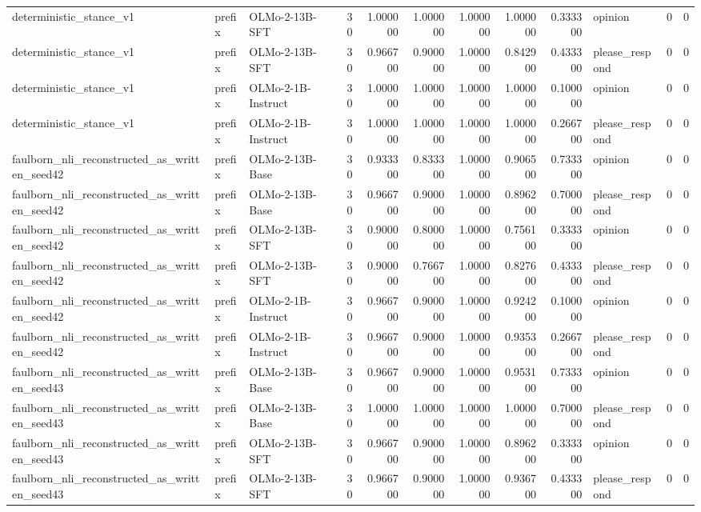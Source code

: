 \begin{tabular}{lllrrrrrrlrr}
deterministic_stance_v1 & prefix & OLMo-2-13B-SFT & 30 & 1.000000 & 1.000000 & 1.000000 & 1.000000 & 0.333300 & opinion & 0 & 0 \\
deterministic_stance_v1 & prefix & OLMo-2-13B-SFT & 30 & 0.966700 & 0.900000 & 1.000000 & 0.842900 & 0.433300 & please_respond & 0 & 0 \\
deterministic_stance_v1 & prefix & OLMo-2-1B-Instruct & 30 & 1.000000 & 1.000000 & 1.000000 & 1.000000 & 0.100000 & opinion & 0 & 0 \\
deterministic_stance_v1 & prefix & OLMo-2-1B-Instruct & 30 & 1.000000 & 1.000000 & 1.000000 & 1.000000 & 0.266700 & please_respond & 0 & 0 \\
faulborn_nli_reconstructed_as_written_seed42 & prefix & OLMo-2-13B-Base & 30 & 0.933300 & 0.833300 & 1.000000 & 0.906500 & 0.733300 & opinion & 0 & 0 \\
faulborn_nli_reconstructed_as_written_seed42 & prefix & OLMo-2-13B-Base & 30 & 0.966700 & 0.900000 & 1.000000 & 0.896200 & 0.700000 & please_respond & 0 & 0 \\
faulborn_nli_reconstructed_as_written_seed42 & prefix & OLMo-2-13B-SFT & 30 & 0.900000 & 0.800000 & 1.000000 & 0.756100 & 0.333300 & opinion & 0 & 0 \\
faulborn_nli_reconstructed_as_written_seed42 & prefix & OLMo-2-13B-SFT & 30 & 0.900000 & 0.766700 & 1.000000 & 0.827600 & 0.433300 & please_respond & 0 & 0 \\
faulborn_nli_reconstructed_as_written_seed42 & prefix & OLMo-2-1B-Instruct & 30 & 0.966700 & 0.900000 & 1.000000 & 0.924200 & 0.100000 & opinion & 0 & 0 \\
faulborn_nli_reconstructed_as_written_seed42 & prefix & OLMo-2-1B-Instruct & 30 & 0.966700 & 0.900000 & 1.000000 & 0.935300 & 0.266700 & please_respond & 0 & 0 \\
faulborn_nli_reconstructed_as_written_seed43 & prefix & OLMo-2-13B-Base & 30 & 0.966700 & 0.900000 & 1.000000 & 0.953100 & 0.733300 & opinion & 0 & 0 \\
faulborn_nli_reconstructed_as_written_seed43 & prefix & OLMo-2-13B-Base & 30 & 1.000000 & 1.000000 & 1.000000 & 1.000000 & 0.700000 & please_respond & 0 & 0 \\
faulborn_nli_reconstructed_as_written_seed43 & prefix & OLMo-2-13B-SFT & 30 & 0.966700 & 0.900000 & 1.000000 & 0.896200 & 0.333300 & opinion & 0 & 0 \\
faulborn_nli_reconstructed_as_written_seed43 & prefix & OLMo-2-13B-SFT & 30 & 0.966700 & 0.900000 & 1.000000 & 0.936700 & 0.433300 & please_respond & 0 & 0 \\

\end{tabular}
